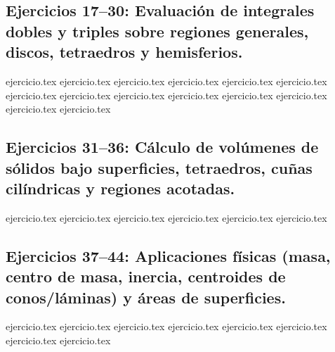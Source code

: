 \subsection*{Ejercicios 17--30: Evaluación de integrales dobles y triples sobre regiones generales, discos, tetraedros y hemisferios.}
\begin{enumerate}
    \setcounter{enumi}{16}
    {ejercicio.tex}
    {ejercicio.tex}
    {ejercicio.tex}
    {ejercicio.tex}
    {ejercicio.tex}
    {ejercicio.tex}
    {ejercicio.tex}
    {ejercicio.tex}
    {ejercicio.tex}
    {ejercicio.tex}
    {ejercicio.tex}
    {ejercicio.tex}
    {ejercicio.tex}
    {ejercicio.tex}
\end{enumerate}

\subsection*{Ejercicios 31--36: Cálculo de volúmenes de sólidos bajo superficies, tetraedros, cuñas cilíndricas y regiones acotadas.}
\begin{enumerate}
    \setcounter{enumi}{30}
    {ejercicio.tex}
    {ejercicio.tex}
    {ejercicio.tex}
    {ejercicio.tex}
    {ejercicio.tex}
    {ejercicio.tex}
\end{enumerate}

\subsection*{Ejercicios 37--44: Aplicaciones físicas (masa, centro de masa, inercia, centroides de conos/láminas) y áreas de superficies.}
\begin{enumerate}
    \setcounter{enumi}{36}
    {ejercicio.tex}
    {ejercicio.tex}
    {ejercicio.tex}
    {ejercicio.tex}
    {ejercicio.tex}
    {ejercicio.tex}
    {ejercicio.tex}
    {ejercicio.tex}
\end{enumerate}

